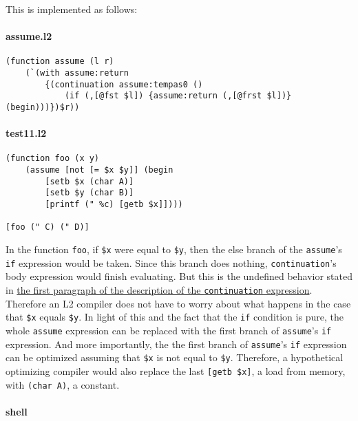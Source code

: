 \documentclass[]{article}
\let\oldparagraph\paragraph
\renewcommand{\paragraph}[1]{\oldparagraph{#1}\mbox{}}
\begin{document}
This is implemented as follows:

\hypertarget{assume.l2}{%
\paragraph{assume.l2}\label{assume.l2}}

\begin{verbatim}
(function assume (l r)
    (`(with assume:return
        {(continuation assume:tempas0 ()
            (if (,[@fst $l]) {assume:return (,[@frst $l])} (begin)))})$r))
\end{verbatim}

\hypertarget{test11.l2}{%
\paragraph{test11.l2}\label{test11.l2}}

\begin{verbatim}
(function foo (x y)
    (assume [not [= $x $y]] (begin
        [setb $x (char A)]
        [setb $y (char B)]
        [printf (" %c) [getb $x]])))

[foo (" C) (" D)]
\end{verbatim}

In the function \texttt{foo}, if \texttt{\$x} were equal to
\texttt{\$y}, then the else branch of the \texttt{assume}'s \texttt{if}
expression would be taken. Since this branch does nothing,
\texttt{continuation}'s body expression would finish evaluating. But
this is the undefined behavior stated in
\protect\hyperlink{continuation}{the first paragraph of the description
of the \texttt{continuation} expression}. Therefore an L2 compiler does
not have to worry about what happens in the case that \texttt{\$x}
equals \texttt{\$y}. In light of this and the fact that the \texttt{if}
condition is pure, the whole \texttt{assume} expression can be replaced
with the first branch of \texttt{assume}'s \texttt{if} expression. And
more importantly, the the first branch of \texttt{assume}'s \texttt{if}
expression can be optimized assuming that \texttt{\$x} is not equal to
\texttt{\$y}. Therefore, a hypothetical optimizing compiler would also
replace the last \texttt{{[}getb\ \$x{]}}, a load from memory, with
\texttt{(char\ A)}, a constant.

\hypertarget{shell-10}{%
\paragraph{shell}\label{shell-10}}
\end{document}

